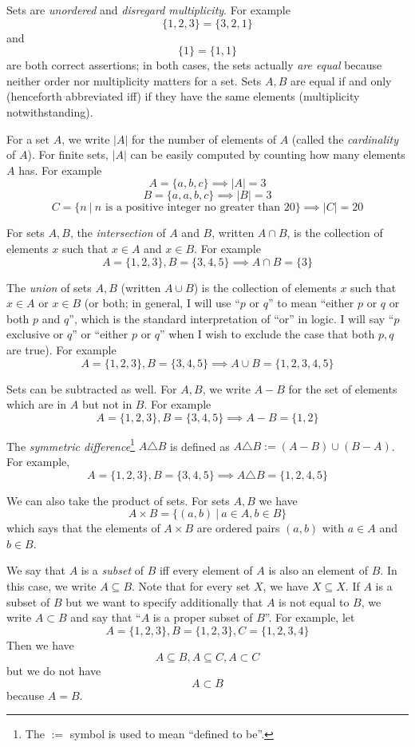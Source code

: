 \documentclass[12pt]{article}
\begin{document}
Sets are \emph{unordered} and \emph{disregard multiplicity}. For example
\[
  \{1, 2, 3\} = \{3, 2, 1\}
\]
and
\[
  \{1\} = \{1, 1\}
\]
are both correct assertions; in both cases, the sets actually \emph{are equal} because neither order nor multiplicity matters for a set. Sets $A, B$ are equal if and only (henceforth abbreviated iff) if they have the same elements (multiplicity notwithstanding). 

For a set $A$, we write $|A|$ for the number of elements of $A$ (called the \emph{cardinality} of $A$). For finite sets, $|A|$ can be easily computed by counting how many elements $A$ has. For example
\[
  A = \{a, b, c\} \implies |A| = 3
\]
\[
  B = \{a, a, b, c\} \implies |B| = 3
\]
\[
  C = \{n\ |\ n \text{ is a positive integer no greater than }20\} \implies |C| = 20
\]

For sets $A, B$, the \emph{intersection} of $A$ and $B$, written $A \cap B$, is the collection of elements $x$ such that $x \in A$ and $x \in B$. For example
\[
  A = \{1, 2, 3\}, B = \{3, 4, 5\} \implies A \cap B = \{3\}
\]

The \emph{union} of sets $A, B$ (written $A \cup B$) is the collection of elements $x$ such that $x\in A$ or $x \in B$ (or both; in general, I will use ``$p$ or $q$'' to mean ``either $p$ or $q$ or both $p$ and $q$'', which is the standard interpretation of ``or'' in logic. I will say ``$p$ exclusive or $q$'' or ``either $p$ or $q$'' when I wish to exclude the case that both $p, q$ are true). For example
\[
  A = \{1, 2, 3\}, B = \{3, 4, 5\} \implies A \cup B = \{1, 2,3 , 4, 5\}
\]

Sets can be subtracted as well. For $A, B$, we write $A - B$ for the set of elements which are in $A$ but not in $B$. For example
\[
  A = \{1, 2, 3\}, B = \{3, 4, 5\} \implies A - B = \{1, 2\}
\]

The \emph{symmetric difference}\footnote{The $:=$ symbol is used to mean ``defined to be''.} $A \triangle B$ is defined as $A \triangle B := (A-B)\cup(B-A)$. For example, 
\[
  A = \{1, 2, 3\}, B = \{3, 4, 5\} \implies A \triangle B = \{1, 2, 4, 5\}
\]

We can also take the product of sets. For sets $A, B$ we have
\[
  A \times B = \{(a, b)\ |\ a \in A, b \in B \}
\]
which says that the elements of $A \times B$ are ordered pairs $(a, b)$ with $a \in A$ and $b \in B$. 

We say that $A$ is a \emph{subset} of $B$ iff every element of $A$ is also an element of $B$. In this case, we write $A \subseteq B$. Note that for every set $X$, we have $X \subseteq X$. If $A$ is a subset of $B$ but we want to specify additionally that $A$ is not equal to $B$, we write $A \subset B$ and say that ``$A$ is a proper subset of $B$''. For example, let
\[
  A = \{1, 2, 3\}, B = \{1, 2, 3\}, C = \{1, 2, 3, 4\}
\]
Then we have
\[
  A \subseteq B, A \subseteq C, A \subset C
\]
but we do not have
\[
  A \subset B
\]
because $A = B$. 
\end{document}
